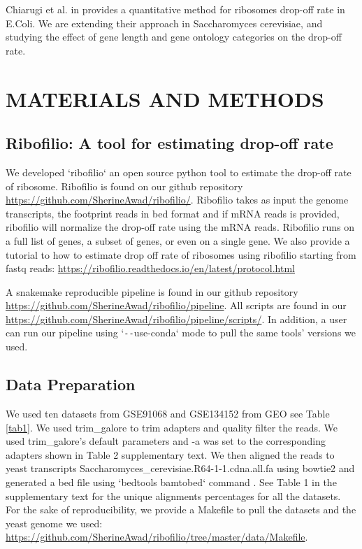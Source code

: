 \documentclass[a4,center,fleqn]{NAR}
\begin{document}
 

Chiarugi et al. in \cite{chiarugi2016} provides a quantitative method for ribosomes drop-off rate in E.Coli. We are extending their approach in Saccharomyces cerevisiae, and studying the effect of gene length and gene ontology categories on the drop-off rate. 


\section{MATERIALS AND METHODS}


\subsection{Ribofilio: A tool for estimating drop-off rate} 
We developed `ribofilio` an open source  python tool to estimate the drop-off rate of ribosome. Ribofilio is found on our github repository \url{https://github.com/SherineAwad/ribofilio/}.  Ribofilio takes as input the genome transcripts, the footprint reads in bed format and if mRNA reads is provided, ribofilio will normalize the drop-off rate using the mRNA reads.
Ribofilio runs on a full list of genes, a subset of genes, or even on a single gene.
We also provide a tutorial to how to estimate  drop off rate of ribosomes using ribofilio starting from fastq reads: \url{https://ribofilio.readthedocs.io/en/latest/protocol.html} 

A snakemake reproducible pipeline is found in our github repository \url{https://github.com/SherineAwad/ribofilio/pipeline}. All scripts are found in our \url{https://github.com/SherineAwad/ribofilio/pipeline/scripts/}.  In addition, a user can run our pipeline using `\texttt{-{}-}use-conda` mode to pull the same tools' versions we used. 

\subsection{Data Preparation}

We used ten datasets from GSE91068 and GSE134152 from GEO see Table \ref{tab1}. We used trim\_galore to trim adapters and quality filter the reads. We used  trim\_galore's default parameters and -a was set to the corresponding adapters shown in Table 2 supplementary text. We then aligned the reads to yeast transcripts Saccharomyces\_cerevisiae.R64-1-1.cdna.all.fa using bowtie2 \cite{langmead2012fast} and generated a bed file using `bedtools bamtobed` command \cite{quinlan2010bedtools}.  See Table 1 in the supplementary text for the unique alignments percentages for all the datasets. For the sake of reproducibility, we provide a Makefile to pull the datasets  and the yeast genome we used: \url{https://github.com/SherineAwad/ribofilio/tree/master/data/Makefile}.
\end{document}
